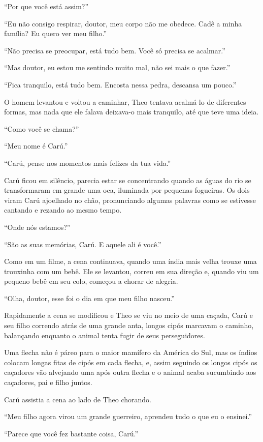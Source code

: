``Por que você está assim?''

``Eu não consigo respirar, doutor, meu corpo não me obedece. Cadê a
minha família? Eu quero ver meu filho.''

``Não precisa se preocupar, está tudo bem. Você só precisa se acalmar.''

``Mas doutor, eu estou me sentindo muito mal, não sei mais o que
fazer.''

``Fica tranquilo, está tudo bem. Encosta nessa pedra, descansa um
pouco.''

O homem levantou e voltou a caminhar, Theo tentava acalmá-lo de
diferentes formas, mas nada que ele falava deixava-o mais tranquilo, até
que teve uma ideia.

``Como você se chama?''

``Meu nome é Carú.''

``Carú, pense nos momentos mais felizes da tua vida.''

Carú ficou em silêncio, parecia estar se concentrando quando as águas do
rio se transformaram em grande uma oca, iluminada por pequenas
fogueiras. Os dois viram Carú ajoelhado no chão, pronunciando algumas
palavras como se estivesse cantando e rezando ao mesmo tempo.

``Onde nós estamos?''

``São as suas memórias, Carú. E aquele ali é você.''

Como em um filme, a cena continuava, quando uma índia mais velha trouxe
uma trouxinha com um bebê. Ele se levantou, correu em sua direção e,
quando viu um pequeno bebê em seu colo, começou a chorar de alegria.

``Olha, doutor, esse foi o dia em que meu filho nasceu.''

Rapidamente a cena se modificou e Theo se viu no meio de uma caçada,
Carú e seu filho correndo atrás de uma grande anta, longos cipós
marcavam o caminho, balançando enquanto o animal tenta fugir de seus
perseguidores.

Uma flecha não é páreo para o maior mamífero da América do Sul, mas os
índios colocam longas fitas de cipós em cada flecha, e, assim seguindo
os longos cipós os caçadores vão alvejando uma após outra flecha e o
animal acaba sucumbindo aos caçadores, pai e filho juntos.

Carú assistia a cena ao lado de Theo chorando.

``Meu filho agora virou um grande guerreiro, aprendeu tudo o que eu o
ensinei.''

``Parece que você fez bastante coisa, Carú.''

